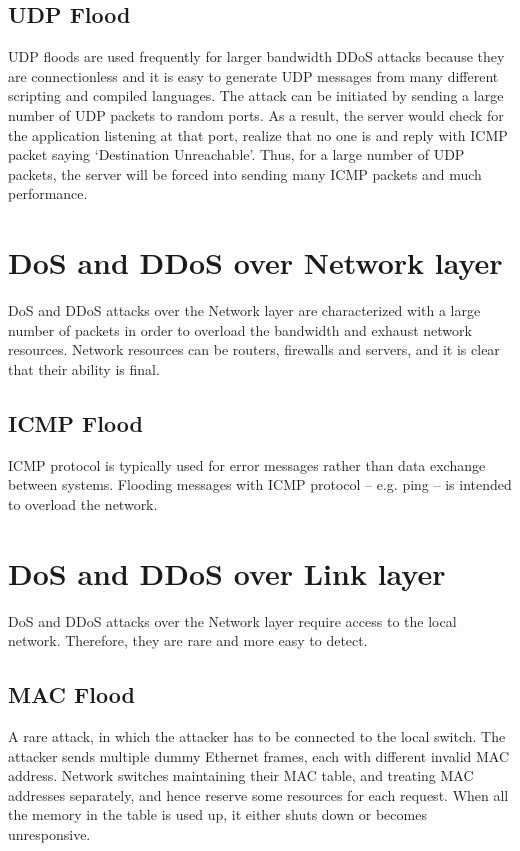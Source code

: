 \documentclass{report}
\begin{document}
\subsection{UDP Flood} UDP floods are used frequently for larger bandwidth DDoS attacks because they are connectionless and it is easy to generate UDP messages from many different scripting and compiled languages. The attack can be initiated by sending a large number of UDP packets to random ports. As a result, the server would check for the application listening at that port, realize that no one is and reply with ICMP packet saying ‘Destination Unreachable’. Thus, for a large number of UDP packets, the server will be forced into sending many ICMP packets and much performance.

\newpage
\section {DoS and DDoS over Network layer} 

 \hfill \break DoS and DDoS attacks over the Network layer are characterized with a large number of packets in order to overload the bandwidth and exhaust network resources. Network resources can be routers, firewalls and servers, and it is clear that their ability is final.

\subsection{ICMP Flood} ICMP protocol is typically used for error messages rather than data exchange between systems. Flooding messages with ICMP protocol – e.g. ping – is intended to overload the network.

 \hfill \break
\section {DoS and DDoS over Link layer}  

 \hfill \break DoS and DDoS attacks over the Network layer require access to the local network. Therefore, they are rare and more easy to detect.

\subsection{MAC Flood} A rare attack, in which the attacker has to be connected to the local switch. The attacker sends multiple dummy Ethernet frames, each with different invalid MAC address. Network switches maintaining their MAC table, and treating MAC addresses separately, and hence reserve some resources for each request. When all the memory in the table is used up, it either shuts down or becomes unresponsive.
\end{document}
